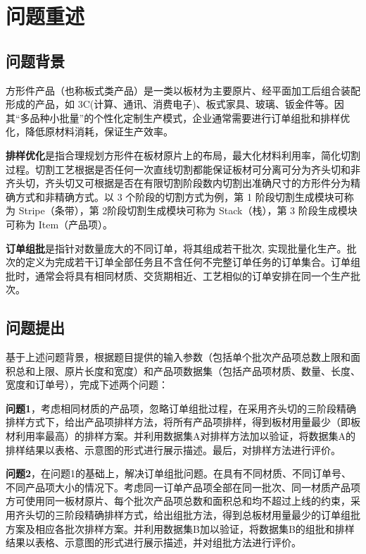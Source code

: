 \documentclass[bwprint]{gmcmthesis}
\begin{document}

\section{问题重述}
\subsection{问题背景}

方形件产品（也称板式类产品）是一类以板材为主要原片、经平面加工后组合装配形成的产品，如 3C(计算、通讯、消费电子)、板式家具、玻璃、钣金件等。因其“多品种小批量”的个性化定制生产模式，企业通常需要进行订单组批和排样优化，降低原材料消耗，保证生产效率。

\textbf{排样优化}是指合理规划方形件在板材原片上的布局，最大化材料利用率，简化切割过程。切割工艺根据是否任何一次直线切割都能保证板材可分离可分为齐头切和非齐头切，齐头切又可根据是否在有限切割阶段数内切割出准确尺寸的方形件分为精确方式和非精确方式。以 3 个阶段的切割方式为例，第 1 阶段切割生成模块可称为 Stripe（条带），第 2阶段切割生成模块可称为 Stack（栈），第 3 阶段生成模块可称为 Item（产品项）。

\textbf{订单组批}是指针对数量庞大的不同订单，将其组成若干批次, 实现批量化生产。批次的定义为完成若干订单全部任务且不含任何不完整订单任务的订单集合。订单组批时，通常会将具有相同材质、交货期相近、工艺相似的订单安排在同一个生产批次。

\subsection{问题提出}
基于上述问题背景，根据题目提供的输入参数（包括单个批次产品项总数上限和面积总和上限、原片长度和宽度）和产品项数据集（包括产品项材质、数量、长度、宽度和订单号），完成下述两个问题：

\textbf{问题1}，考虑相同材质的产品项，忽略订单组批过程，在采用齐头切的三阶段精确排样方式下，给出产品项排样方法，将所有产品项排样，得到板材用量最少（即板材利用率最高）的排样方案。并利用数据集A对排样方法加以验证，将数据集A的排样结果以表格、示意图的形式进行展示描述。最后，对排样方法进行评价。

\textbf{问题2}，在问题1的基础上，解决订单组批问题。在具有不同材质、不同订单号、不同产品项大小的情况下。考虑同一订单产品项全部在同一批次、同一材质产品项方可使用同一板材原片、每个批次产品项总数和面积总和均不超过上线的约束，采用齐头切的三阶段精确排样方式，给出组批方法，得到总板材用量最少的订单组批方案及相应各批次排样方案。并利用数据集B加以验证，将数据集B的组批和排样结果以表格、示意图的形式进行展示描述，并对组批方法进行评价。
\end{document}
